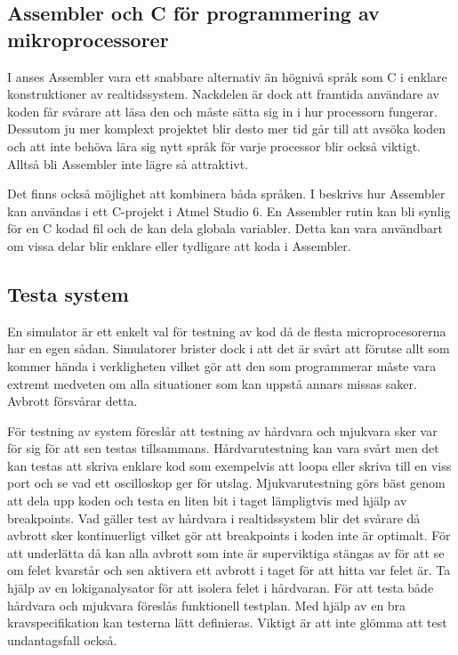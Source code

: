 \documentclass[11pt]{article}
\begin{document}
\begin{flushleft}
\subsection{Assembler och C för programmering av mikroprocessorer}

I \cite{RWD} anses Assembler vara ett snabbare alternativ än högnivå språk som C i enklare konstruktioner av realtidssystem. Nackdelen är dock att framtida användare av koden får svårare att läsa den och måste sätta sig in i hur processorn fungerar. Dessutom ju mer komplext projektet blir desto mer tid går till att avsöka koden och att inte behöva lära sig nytt språk för varje processor blir också viktigt. Alltså bli Assembler inte lägre så attraktivt. 

Det finns också möjlighet att kombinera båda språken. I \cite{AssC} beskrivs hur Assembler kan användas i ett C-projekt i Atmel Studio 6. En Assembler rutin kan bli synlig för en C kodad fil och de kan dela globala variabler. Detta kan vara användbart om vissa delar blir enklare eller tydligare att koda i Assembler.

\subsection{Testa system}
En simulator är ett enkelt val för testning av kod då de flesta microprocesorerna har en egen sådan. Simulatorer brister dock i att det är svårt att förutse allt som kommer hända i verkligheten vilket gör att den som programmerar måste vara extremt medveten om alla situationer som kan uppstå annars missas saker. Avbrott försvårar detta.\cite{RWD}

För testning av system föreslår \cite{RWD} att testning av hårdvara och mjukvara sker var för sig för att sen testas tillsammans. Hårdvarutestning kan vara svårt men det kan testas att skriva enklare kod som exempelvis att loopa eller skriva till en viss port och se vad ett oscilloskop ger för utslag. Mjukvarutestning görs bäst genom att dela upp koden och testa en liten bit i taget lämpligtvis med hjälp av breakpoints. Vad gäller test av hårdvara i realtidssystem blir det svårare då avbrott sker kontinuerligt vilket gör att breakpoints i koden inte är optimalt. För att underlätta då kan alla avbrott som inte är superviktiga stängas av för att se om felet kvarstår och sen aktivera ett avbrott i taget för att hitta var felet är. Ta hjälp av en lokiganalysator för att isolera felet i hårdvaran. För att testa både hårdvara och mjukvara föreslås funktionell testplan. Med hjälp av en bra kravspecifikation kan testerna lätt definieras. Viktigt är att inte glömma att test undantagsfall också. 



\end{flushleft}
\end{document}
